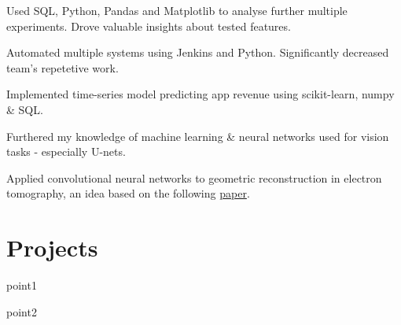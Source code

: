 \documentclass[]{CV}
\begin{document}
\begin{minipage}[t]{0.70\textwidth}
\begin{tightemize}
\item Used SQL, Python, Pandas and Matplotlib to analyse further multiple experiments. Drove valuable insights about tested features.

\item Automated multiple systems using Jenkins and Python. Significantly decreased team's repetetive work.

\item Implemented time-series model predicting app revenue using scikit-learn, numpy \& SQL.

\end{tightemize}
\sectionsep

\vspace{\topsep} %
\begin{tightemize}
\sectionsep
\item Furthered my knowledge of machine learning \& neural networks used for vision tasks - especially U-nets.

\item  Applied convolutional neural networks to geometric reconstruction in electron tomography, an idea based on the following {\href{https://core.ac.uk/download/pdf/204935374.pdf}{paper}}.

\end{tightemize}
\sectionsep



\section{Projects}

\begin{tightemize}

\item point1

\item point2

\end{tightemize}
\sectionsep

\begin{tightemize}


\end{tightemize}
\end{minipage}
\end{document}
